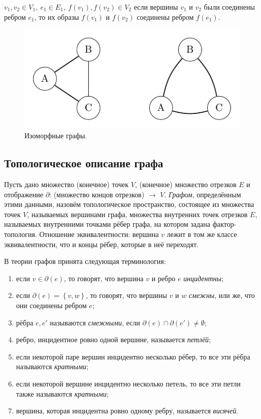 $v_1, v_2 \in V_1, \ e_1 \in E_1, \ f(v_1), f(v_2) \in V_2$ если вершины $v_1$ и $v_2$ были соединены ребром $e_1$, то их образы $f(v_1)$ и $f(v_2)$ соединены ребром $f(e_1)$.

\begin{figure}[h]
    \centering
    \includegraphics{images/c3.2.pdf}
    \caption{Изоморфные графы.}
    \label{fig:c3.2}
\end{figure}

\subsection{Топологическое описание графа}
\begin{definition}
    Пусть дано множество (конечное) точек $V$, (конечное) множество отрезков $E$ и отображение $\partial$: (множество концов отрезков) $\to$ $V$. \textit{Графом}, определённым этими данными, назовём топологическое пространство, состоящее из множества точек $V$, называемых вершинами графа, множества внутренних точек отрезков $E$, называемых внутренними точками рёбер графа, на котором задана фактор-топология. Отношение эквивалентности: вершина $v$ лежит в том же классе эквивалентности, что и концы рёбер, которые в неё переходят.
\end{definition}

В теории графов принята следующая терминология:
\begin{enumerate}
    \item если $v \in \partial(e)$, то говорят, что вершина $v$ и ребро $e$ \textit{инцидентны};
    \item если $\partial(e) = \left\{v,w\right\}$, то говорят, что вершины $v$ и $w$ \textit{смежны}, или же, что они соединены ребром $e$;
    \item рёбра $e, e'$ называются \textit{смежными}, если $\partial(e) \cap \partial(e') \neq \emptyset$;
    \item ребро, инцидентное ровно одной вершине, называется \textit{петлёй};
    \item если некоторой паре вершин инцидентно несколько рёбер, то все эти рёбра называются \textit{кратными};
    \item если некоторой вершине инцидентно несколько петель, то все эти петли также называются \textit{кратными};
    \item вершина, которая инцидентна ровно одному ребру, называется \textit{висячей}.
\end{enumerate}


